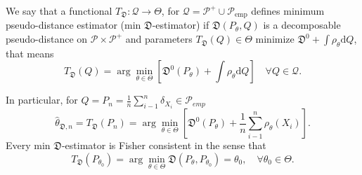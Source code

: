 {\begin{definition}
	We say that a functional $T_\mathfrak{D}:\mathcal{Q} \rightarrow \Theta$, for $\mathcal{Q}=\mathcal{P}^+ \cup \mathcal{P}_{\text{emp}}$	defines minimum pseudo-distance estimator (min $\mathfrak{D}$-estimator) if $\mathfrak{D}(P_\theta,Q)$ is a decomposable pseudo-distance on $\mathcal{P}\times\mathcal{P}^+$ and parameters $T_\mathfrak{D}(Q) \in \Theta$ minimize $\mathfrak{D}^0 + \int{\rho_\theta}\mathrm{d}Q$, that means
	\begin{equation}
		T_\mathfrak{D}(Q) = \arg\min_{\theta \in \Theta} \left[ \mathfrak{D}^0(P_\theta) + \int{\rho_\theta}\mathrm{d}Q \right] \quad \forall Q \in \mathcal{Q}.
	\end{equation}
\end{definition}
In particular, for $Q = P_n = \frac{1}{n}\sum_{i-1}^n \delta_{X_i} \in \mathcal{P}_{emp}$
\begin{equation}
	\hat{\theta}_{\mathfrak{D},n} =T_\mathfrak{D}(P_n)  = \arg\min_{\theta \in \Theta}\left[ \mathfrak{D}^0(P_\theta) + \dfrac{1}{n} \sum_{i-1}^n \rho_\theta (X_i) \right].
\end{equation}
Every min $\mathfrak{D}$-estimator is Fisher consistent in the sense that 
\begin{equation}
	T_\mathfrak{D}(P_{\theta_0}) = \arg\min_{\theta \in \Theta} \mathfrak{D}(P_\theta, P_{\theta_0}) = \theta_0,\quad \forall \theta_0 \in \Theta.
\end{equation}

}
